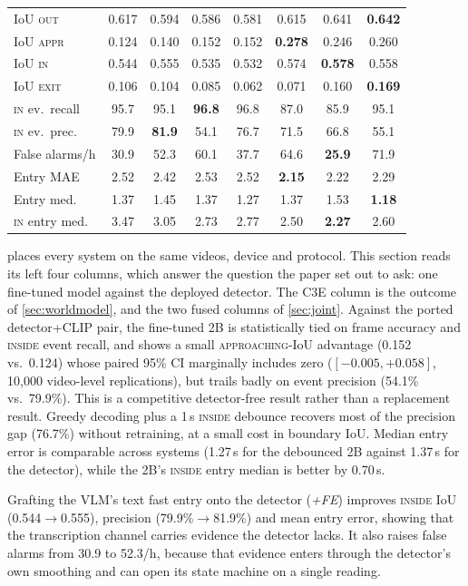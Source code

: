 \documentclass[journal]{IEEEtran}
\begin{document}
\begin{table}[t]
\begin{tabular}{@{}lccccccc@{}}
\midrule
IoU \textsc{out} & 0.617 & 0.594 & 0.586 & 0.581 & 0.615 & 0.641 & \textbf{0.642} \\
IoU \textsc{appr} & 0.124 & 0.140 & 0.152 & 0.152 & \textbf{0.278} & 0.246 & 0.260 \\
IoU \textsc{in} & 0.544 & 0.555 & 0.535 & 0.532 & 0.574 & \textbf{0.578} & 0.558 \\
IoU \textsc{exit} & 0.106 & 0.104 & 0.085 & 0.062 & 0.071 & 0.160 & \textbf{0.169} \\
\midrule
\textsc{in} ev.\ recall & 95.7 & 95.1 & \textbf{96.8} & 96.8 & 87.0 & 85.9 & 95.1 \\
\textsc{in} ev.\ prec.\ & 79.9 & \textbf{81.9} & 54.1 & 76.7 & 71.5 & 66.8 & 55.1 \\
False alarms/h & 30.9 & 52.3 & 60.1 & 37.7 & 64.6 & \textbf{25.9} & 71.9 \\
\midrule
Entry MAE & 2.52 & 2.42 & 2.53 & 2.52 & \textbf{2.15} & 2.22 & 2.29 \\
Entry med.\ & 1.37 & 1.45 & 1.37 & 1.27 & 1.37 & 1.53 & \textbf{1.18} \\
\textsc{in} entry med.\ & 3.47 & 3.05 & 2.73 & 2.77 & 2.50 & \textbf{2.27} & 2.60 \\
\bottomrule
\end{tabular}
\end{table}

 places every system on the same videos, device and protocol.  This section reads its left four columns, which answer the question the paper set out to ask: one fine-tuned model against the deployed detector.  The C3E column is the outcome of \cref{sec:worldmodel}, and the two fused columns of \cref{sec:joint}.  Against the ported detector+CLIP pair, the fine-tuned 2B is statistically tied on frame accuracy and \textsc{inside} event recall, and shows a small \textsc{approaching}-IoU advantage (0.152 vs.\ 0.124) whose paired 95\% CI marginally includes zero ($[-0.005,+0.058]$, 10{,}000 video-level replications), but trails badly on event precision (54.1\% vs.\ 79.9\%).  This is a competitive detector-free result rather than a replacement result.  Greedy decoding plus a 1\,s \textsc{inside} debounce recovers most of the precision gap (76.7\%) without retraining, at a small cost in boundary IoU.  Median entry error is comparable across systems (1.27\,s for the debounced 2B against 1.37\,s for the detector), while the 2B's \textsc{inside} entry median is better by 0.70\,s.

Grafting the VLM's text fast entry onto the detector (\emph{{+}FE}) improves \textsc{inside} IoU (0.544$\to$0.555), precision (79.9\%$\to$81.9\%) and mean entry error, showing that the transcription channel carries evidence the detector lacks.  It also raises false alarms from 30.9 to 52.3/h, because that evidence enters through the detector's own smoothing and can open its state machine on a single reading.
\end{document}
